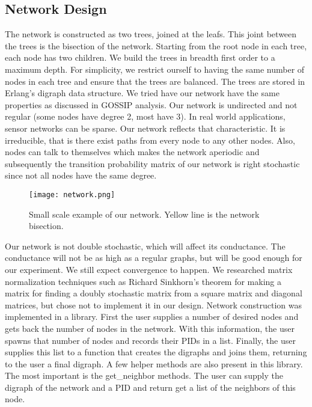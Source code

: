 \subsection{Network Design}
The network is constructed as two trees, joined at the leafs. This joint between the trees is the bisection of the network. Starting from the root node in each tree, each node has two children. We build the trees in breadth first order to a maximum depth. For simplicity, we restrict ourself to having the same number of nodes in each tree and ensure that the trees are balanced. The trees are stored in Erlang's digraph data structure. We tried have our network have the same properties as discussed in GOSSIP analysis. Our network is undirected and not regular (some nodes have degree 2, most have 3). In real world applications, sensor networks can be sparse. Our network reflects that characteristic. It is irreducible, that is there exist paths
from every node to any other nodes. Also, nodes can talk to themselves which makes the network aperiodic and subsequently the transition probability matrix of our network is right stochastic since not all nodes have the same degree.

\begin{figure}[ht!]
\centering
\texttt{[image: network.png]}
\caption{Small scale example of our network. Yellow line is the network bisection.}
\label{overflow}
\end{figure}

Our network is not double stochastic, which will affect its conductance. The conductance will not be as high as a regular graphs, but will be good enough for our experiment. We still expect convergence to happen. We researched matrix normalization techniques such as Richard Sinkhorn's theorem for making a matrix for finding a doubly stochastic matrix from a square matrix and diagonal matrices, but chose not to implement it in our design.
Network construction was implemented in a library. First the user supplies a number of desired nodes and gets back the number of nodes in the network. With this information, the user spawns that number of nodes and records their PIDs in a list. Finally, the user supplies this list to a function that creates the digraphs and joins them, returning to the user a final digraph. A few helper methods are also present in this library. The most important is the get\_neighbor methods. The user can supply the digraph of the network and a PID and return get a list of the neighbors of this node. 

